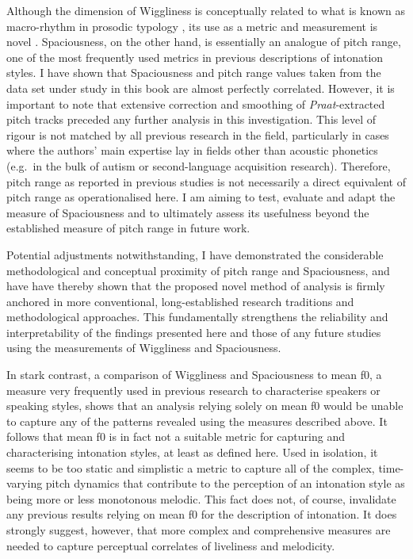\hspace*{-2.2pt}Although the dimension of Wiggliness is conceptually related to what is known as macro-rhythm in prosodic typology \citep{junProsodicTypologyRevisited2012,junProsodicTypologyProminence2014}, its use as a metric and measurement is novel \citep[but see also][]{kalandBendingStringIntonation2022,prechtelCrossLinguisticComparisonLexical2023}. Spaciousness, on the other hand, is essentially an analogue of pitch range, one of the most frequently used metrics in previous descriptions of intonation styles. I have shown that Spaciousness and pitch range values taken from the data set under study in this book are almost perfectly correlated. However, it is important to note that extensive correction and smoothing of \textit{Praat}-extracted pitch tracks preceded any further analysis in this investigation. This level of rigour is not matched by all previous research in the field, particularly in cases where the authors' main expertise lay in fields other than acoustic phonetics (e.g.~in the bulk of autism or second-language acquisition research). Therefore, pitch range as reported in previous studies is not necessarily a direct equivalent of pitch range as operationalised here. I am aiming to test, evaluate and adapt the measure of Spaciousness and to ultimately assess its usefulness beyond the established measure of pitch range in future work.

Potential adjustments notwithstanding, I have demonstrated the considerable methodological and conceptual proximity of pitch range and Spaciousness, and have have thereby shown that the proposed novel method of analysis is firmly anchored in more conventional, long-established research traditions and methodological approaches. This fundamentally strengthens the reliability and interpretability of the findings presented here and those of any future studies using the measurements of Wiggliness and Spaciousness.

In stark contrast, a comparison of Wiggliness and Spaciousness to mean f0, a measure very frequently used in previous research to characterise speakers or speaking styles, shows that an analysis relying solely on mean f0 would be unable to capture any of the patterns revealed using the measures described above. It follows that mean f0 is in fact not a suitable metric for capturing and characterising intonation styles, at least as defined here. Used in isolation, it seems to be too static and simplistic a metric to capture all of the complex, time-varying pitch dynamics that contribute to the perception of an intonation style as being more or less monotonous melodic. This fact does not, of course, invalidate any previous results relying on mean f0 for the description of intonation. It does strongly suggest, however, that more complex and comprehensive measures are needed to capture perceptual correlates of liveliness and melodicity.

